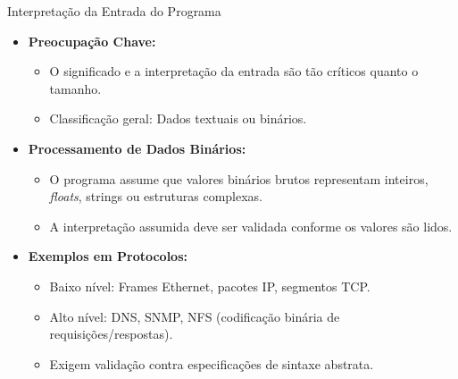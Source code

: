 \begin{frame}{Interpretação da Entrada do Programa}
    \begin{itemize}
        \item \textbf{Preocupação Chave:}
              \begin{itemize}
                  \item O significado e a interpretação da entrada são tão críticos quanto o tamanho.
                  \item Classificação geral: Dados textuais ou binários.
              \end{itemize}

        \item \textbf{Processamento de Dados Binários:}
              \begin{itemize}
                  \item O programa assume que valores binários brutos representam inteiros, \textit{floats}, strings ou estruturas complexas.
                  \item A interpretação assumida deve ser validada conforme os valores são lidos.
              \end{itemize}

        \item \textbf{Exemplos em Protocolos:}
              \begin{itemize}
                  \item Baixo nível: Frames Ethernet, pacotes IP, segmentos TCP.
                  \item Alto nível: DNS, SNMP, NFS (codificação binária de requisições/respostas).
                  \item Exigem validação contra especificações de sintaxe abstrata.
              \end{itemize}
    \end{itemize}
\end{frame}


